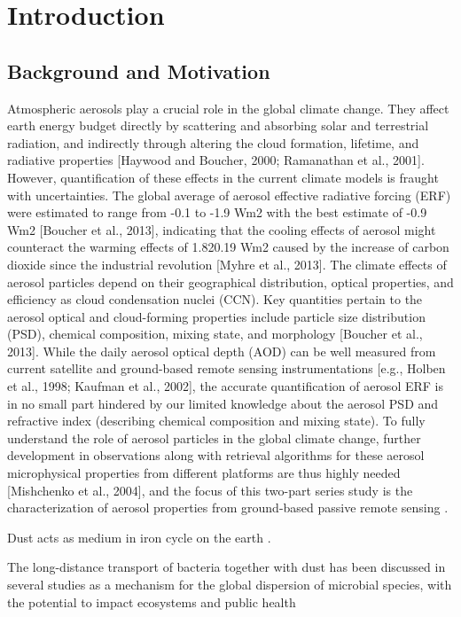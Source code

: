 
\chapter{Introduction}

\section{Background and Motivation}

Atmospheric aerosols play a crucial role in the global
climate change. They affect earth energy budget directly
by scattering and absorbing solar and terrestrial radiation,
and indirectly through altering the cloud formation,
lifetime, and radiative properties [Haywood and Boucher,
2000; Ramanathan et al., 2001]. However, quantification of
these effects in the current climate models is fraught with
uncertainties. The global average of aerosol effective
radiative forcing (ERF) were estimated to range from -0.1
to -1.9 Wm2 with the best estimate of -0.9 Wm2 [Boucher et
al., 2013], indicating that the cooling effects of aerosol
might counteract the warming effects of 1.820.19 Wm2 caused
by the increase of carbon dioxide since the industrial
revolution [Myhre et al., 2013]. The climate effects of
aerosol particles depend on their geographical distribution,
optical properties, and efficiency as cloud condensation
nuclei (CCN). Key quantities pertain to the aerosol optical
and cloud-forming properties include particle size
distribution (PSD), chemical composition, mixing state, and
morphology [Boucher et al., 2013]. While the daily aerosol
optical depth (AOD) can be well measured from current
satellite and ground-based remote sensing instrumentations
[e.g., Holben et al., 1998; Kaufman et al., 2002], the
accurate quantification of aerosol ERF is in no small part
hindered by our limited knowledge about the aerosol PSD and
refractive index (describing chemical composition and
mixing state). To fully understand the role of aerosol
particles in the global climate change, further development
in observations along with retrieval algorithms for these
aerosol microphysical properties from different platforms
are thus highly needed [Mishchenko et al., 2004], and
the focus of this two-part series study is the
characterization of aerosol properties from ground-based
passive remote sensing \citep{henze07}.

  Dust acts as medium in iron cycle on the earth \citep{jickells05}.

  The long-distance transport of bacteria together with dust
  has been discussed in several studies as a mechanism for
  the global dispersion of microbial species,
  with the potential to impact ecosystems and public health
  \citep{griffin01,burrows09}


